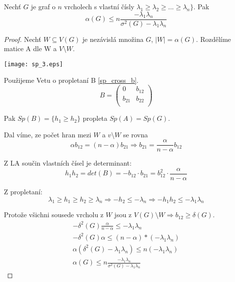 \begin{theorem}
	Nechť $G$ je graf o $n$ vrcholech s vlastní čísly $\lambda_1 \geq \lambda_2 \geq ... \geq \lambda_n \}$. Pak
	\[ \alpha(G) \leq n \frac{-\lambda_1\lambda_n}{\sigma^2(G) - \lambda_1\lambda_n} \]
\end{theorem}
\begin{proof}
	Nechť $W \subseteq V(G)$ je nezávislá množina $G$, $|W| = \alpha(G)$. Rozdělíme matice A dle W a $V\setminus W$.

	\texttt{[image: sp\_3.eps]}

	Použijeme Vetu o propletaní B \cref{sp_cross_b}.
	\[ B =
	\begin{pmatrix}
		0 & b_{12}\\
		b_{21} & b_{22}\\
	\end{pmatrix}
	\]

	Pak $Sp(B) = \{ h_1 \geq h_2 \}$ propleta $Sp(A) = Sp(G)$.

	Dal víme, ze počet hran mezi $W$ a $v\setminus W$ se rovna
	\[ \alpha b_{12} = (n - \alpha) b_{21} \Rightarrow b_{21} = \frac{\alpha}{n - \alpha} b_{12}\]

	Z LA součin vlastních čísel je determinant:
	\[ h_1h_2 = det(B) = -b_{12} \cdot b_{21} = b_{12}^2 \cdot \frac{\alpha}{n - \alpha}\]

	Z propletaní:
	\[ \lambda_1 \geq h_1 \geq h_2 \geq \lambda_n \Rightarrow -h_2 \leq -\lambda_n \Rightarrow -h_1h_2 \leq -\lambda_1 \lambda_n \]

	Protože všichni sousede vrcholu z $W$ jsou z $V(G) \setminus W \Rightarrow b_{12} \geq \delta(G)$.
	\begin{gather*}
	-\delta^2(G) \frac{\alpha}{n - \alpha} \leq -\lambda_1 \lambda_n\\
	-\delta^2(G) \alpha \leq (n - \alpha) * (-\lambda_1 \lambda_n)\\
	\alpha(\delta^2(G) - \lambda_1 \lambda_n) \leq n(-\lambda_1 \lambda_n)\\
	\alpha(G) \leq n \frac{-\lambda_1\lambda_n}{\sigma^2(G) - \lambda_1\lambda_n}
	\end{gather*}
\end{proof}

